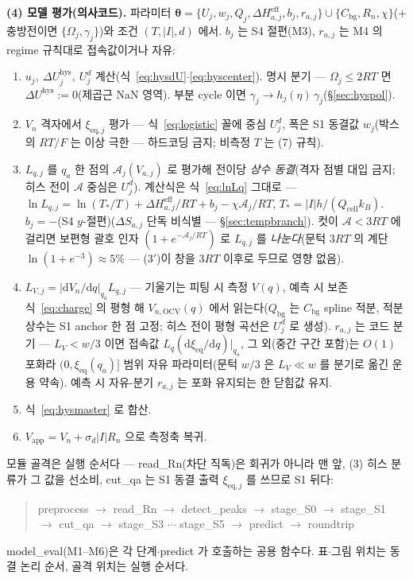 \documentclass[11pt,a4paper]{article}
\newcommand{\dd}{\mathrm{d}}
\newcommand{\eff}{\mathrm{eff}}
\newcommand{\eq}{\mathrm{eq}}
\newcommand{\app}{\mathrm{app}}
\newcommand{\cell}{\mathrm{cell}}
\newcommand{\bg}{\mathrm{bg}}
\newcommand{\OCV}{\mathrm{OCV}}
\newcommand{\hys}{\mathrm{hys}}
\begin{document}
\textbf{(4) 모델 평가(의사코드).} 파라미터 $\bm\theta=\{U_j,w_j,Q_j,\Delta H_{a,j}^{\eff},b_j,r_{a,j}\}\cup\{C_\bg,R_n,\chi\}$($+$충방전이면 $\{\Omega_j,\gamma_j\}$)와 조건 $(T,|I|,d)$ 에서. $b_j$ 는 S4 절편(M3), $r_{a,j}$ 는 M4 의 regime 규칙대로 접속값이거나 자유:
\begin{enumerate}[label=\textbf{M\arabic*.},leftmargin=2.4em,itemsep=1pt]
\item $u_j,\ \Delta U_j^\hys,\ U_j^d$ 계산(식~\eqref{eq:hysdU}$\cdot$\eqref{eq:hyscenter}). 명시 분기 — $\Omega_j\le2RT$ 면 $\Delta U^\hys:=0$(제곱근 NaN 영역). 부분 cycle 이면 $\gamma_j\to h_j(\eta)\,\gamma_j$(\S\ref{sec:hyspol}).
\item $V_n$ 격자에서 $\xi_{\eq,j}$ 평가 — 식~\eqref{eq:logistic} 꼴에 중심 $U_j^d$, 폭은 S1 동결값 $w_j$(박스의 $RT/F$ 는 이상 극한 — 하드코딩 금지; 비측정 $T$ 는 (7) 규칙).
\item $L_{q,j}$ 를 $q_a$ 한 점의 $\mathcal A_j(V_{a,j})$ 로 평가해 전이당 \emph{상수 동결}(격자 점별 대입 금지; 히스 전이 $\mathcal A$ 중심은 $U_j^d$). 계산식은 식~\eqref{eq:lnLq} 그대로 — $\ln L_{q,j}=\ln(T_*/T)+\Delta H_{a,j}^{\eff}/RT+b_j-\chi\mathcal A_j/RT$, $T_*=|I|h/(Q_\cell k_B)$. $b_j=-$(S4 $y$-절편)($\Delta S_{a,j}$ 단독 비식별 — \S\ref{sec:tempbranch}). 컷이 $\mathcal A<3RT$ 에 걸리면 보편형 괄호 인자 $(1+e^{-\mathcal A_j/RT})$ 로 $L_{q,j}$ 를 \emph{나눈다}(문턱 $3RT$ 의 계단 $\ln(1+e^{-3})\approx5\%$ — (3$'$)이 창을 $3RT$ 이후로 두므로 영향 없음).
\item $L_{V,j}=|\dd V_n/\dd q|_{q_a}L_{q,j}$ — 기울기는 피팅 시 측정 $V(q)$, 예측 시 보존식~\eqref{eq:charge} 의 평형 해 $V_{n,\OCV}(q)$ 에서 읽는다($Q_\bg$ 는 $C_\bg$ spline 적분, 적분상수는 S1 anchor 한 점 고정; 히스 전이 평형 곡선은 $U_j^d$ 로 생성). $r_{a,j}$ 는 코드 분기 — $L_V<w/3$ 이면 접속값 $L_{q}(\dd\xi_{\eq}/\dd q)|_{q_a}$, 그 외(중간 구간 포함)는 $O(1)$ 포화라 $(0,\xi_{\eq}(q_a)]$ 범위 자유 파라미터(문턱 $w/3$ 은 $L_V\ll w$ 를 분기로 옮긴 운용 약속). 예측 시 자유-분기 $r_{a,j}$ 는 포화 유지되는 한 닫힘값 유지.
\item 식~\eqref{eq:hysmaster} 로 합산.
\item $V_\app=V_n+\sigma_d|I|R_n$ 으로 측정축 복귀.
\end{enumerate}
모듈 골격은 실행 순서다 — read\_Rn(차단 직독)은 회귀가 아니라 맨 앞, (3) 히스 분류가 그 값을 선소비, cut\_qa 는 S1 동결 출력 $\xi_{\eq,j}$ 를 쓰므로 S1 뒤다:
\begin{quote}\ttfamily\footnotesize
preprocess $\to$ read\_Rn $\to$ detect\_peaks $\to$ stage\_S0 $\to$ stage\_S1\\
$\to$ cut\_qa $\to$ stage\_S3 $\cdots$ stage\_S5 $\to$ predict $\to$ roundtrip
\end{quote}
model\_eval(M1--M6)은 각 단계$\cdot$predict 가 호출하는 공용 함수다. 표$\cdot$그림 위치는 동결 논리 순서, 골격 위치는 실행 순서다.
\end{document}
